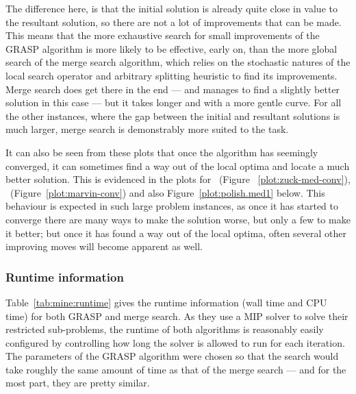 \documentclass[journal]{IEEEtran}
\begin{document}
The difference here, is that the initial solution is already quite close in value to the resultant solution, so there are not a lot of improvements that can be made. This means that the more exhaustive search for small improvements of the GRASP algorithm is more likely to be effective, early on, than the more global search of the merge search algorithm, which relies on the stochastic natures of the local search operator and arbitrary splitting heuristic to find its improvements. Merge search does get there in the end --- and manages to find a slightly better solution in this case --- but it takes longer and with a more gentle curve. For all the other instances, where the gap between the initial and resultant solutions is much larger, merge search is demonstrably more suited to the task.

It can also be seen from these plots that once the algorithm has seemingly converged, it can sometimes find a way out of the local optima and locate a much better solution. This is evidenced in the plots for \zuckmed{}~(Figure ~\ref{plot:zuck-med-conv}), \marvin{}~(Figure~\ref{plot:marvin-conv}) and also Figure~\ref{plot:polish.med1} below. This behaviour is expected in such large problem instances, as once it has started to converge there are many ways to make the solution worse, but only a few to make it better; but once it has found a way out of the local optima, often several other improving moves will become apparent as well.

\subsubsection*{\textbf{Runtime information}}

Table~\ref{tab:mine:runtime} gives the runtime information (wall time and CPU time) for both GRASP and merge search. As they use a MIP solver to solve their restricted sub-problems, the runtime of both algorithms is reasonably easily configured by controlling how long the solver is allowed to run for each iteration. The parameters of the GRASP algorithm were chosen so that the search would take roughly the same amount of time as that of the merge search --- and for the most part, they are pretty similar. 
\end{document}
